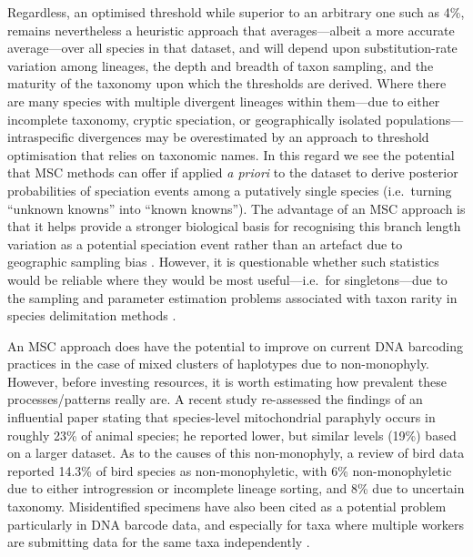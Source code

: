 \documentclass[12pt]{article}
\begin{document}
Regardless, an optimised threshold while superior to an arbitrary one such as 4\%, remains nevertheless a heuristic approach that averages---albeit a more accurate average---over all species in that dataset, and will depend upon substitution-rate variation among lineages, the depth and breadth of taxon sampling, and the maturity of the taxonomy upon which the thresholds are derived. Where there are many species with multiple divergent lineages within them---due to either incomplete taxonomy, cryptic speciation, or geographically isolated populations---intraspecific divergences may be overestimated by an approach to threshold optimisation that relies on taxonomic names. In this regard we see the potential that MSC methods can offer if applied \emph{a priori} to the dataset to derive posterior probabilities of speciation events among a putatively single species (i.e.\ turning ``unknown knowns'' into ``known knowns''). The advantage of an MSC approach is that it helps provide a stronger biological basis for recognising this branch length variation as a potential speciation event rather than an artefact due to geographic sampling bias \citep{Bergsten2012}. However, it is questionable whether such statistics would be reliable where they would be most useful---i.e.\ for singletons---due to the sampling and parameter estimation problems associated with taxon rarity in species delimitation  methods \citep{Lim2012}.

An MSC approach does have the potential to improve on current DNA barcoding practices in the case of mixed clusters of haplotypes due to non-monophyly. However, before investing resources, it is worth estimating how prevalent these processes/patterns really are. A recent study \citep{Ross2014} re-assessed the findings of an influential paper \citep{Funk2003} stating that species-level mitochondrial paraphyly occurs in roughly 23\% of animal species; he reported lower, but similar levels (19\%) based on a larger dataset. As to the causes of this non-monophyly, a review of bird data \citep{McKay2010} reported 14.3\% of bird species as non-monophyletic, with 6\% non-monophyletic due to either introgression or incomplete lineage sorting, and 8\% due to uncertain taxonomy. Misidentified specimens have also been cited as a potential problem particularly in DNA barcode data, and especially for taxa where multiple workers are submitting data for the same taxa independently \citep{Collins2013}. 
\end{document}
